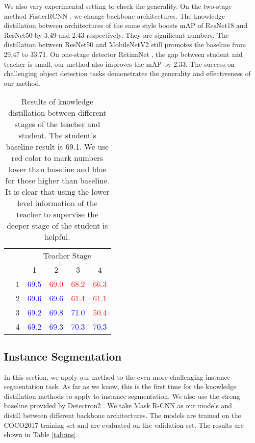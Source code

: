 \documentclass[final]{cvpr}
\begin{document}
We also vary experimental setting to check the generality. On the two-stage method FasterRCNN \cite{faster}, we change backbone architectures. The knowledge distillation between architectures of the same style boosts mAP of ResNet18 and ResNet50 by 3.49 and 2.43 respectively. They are significant numbers. The distillation between ResNet50 and MobileNetV2 still promotes the baseline from 29.47 to 33.71. On one-stage detector RetinaNet \cite{retinanet}, the gap between student and teacher is small, our method also improves the mAP by 2.33. The success on challenging object detection tasks demonstrates the generality and effectiveness of our method.



\newcommand{\tred}{\textcolor{red}}

\newcommand{\tgreen}{\textcolor{blue}}

\begin{table}
	\centering
	\begin{tabular}{c c | c c c c}
		\toprule
		& & \multicolumn{4}{c}{Teacher Stage} \\
		& & 1 & 2 & 3 & 4 \\
		\midrule
		\multirow{4}{*}{\rotatebox{90}{Student Stage}}	
		& 1 & \tgreen{69.5} & \tred{69.0} & \tred{68.2} & \tred{66.3} \\
		\cmidrule{3-6}
		& 2 & \tgreen{69.6} & \tgreen{69.6} & \tred{61.4} & \tred{61.1}\\
		\cmidrule{3-6}
		& 3 & \tgreen{69.2} & \tgreen{69.8} & \tgreen{71.0} &\tred{50.4} \\
		\cmidrule{3-6}
		& 4 & \tgreen{69.2} & \tgreen{69.3} & \tgreen{70.3} & \tgreen{70.3} \\
		\bottomrule
	\end{tabular}
	\vspace{0.1in}
	\caption{Results of knowledge distillation between different stages of the teacher and student. The student's baseline result is 69.1. We use red color to mark numbers lower than baseline and blue for those higher than baseline. It is clear that using the lower level information of the teacher to supervise the deeper stage of the student is helpful. }
	\label{tab:analysis1}
\end{table}

\subsection{Instance Segmentation}

In this section, we apply our method to the even more challenging instance segmentation task. As far as we know, this is the first time for the knowledge distillation methods to apply to instance segmentation. We also use the strong baseline provided by Detectron2 \cite{wu2019detectron2}. We take Mask R-CNN \cite{mask} as our models and distill between different backbone architectures. The models are trained on the COCO2017 training set and are evaluated on the validation set. The results are shown in Table \ref{tab:ins}.
\end{document}
